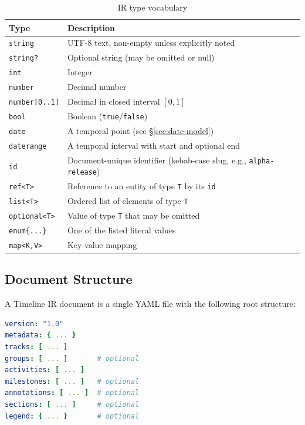 \begin{table}[h]
\centering
\begin{tabular}{lp{10cm}}
\toprule
\textbf{Type} & \textbf{Description} \\
\midrule
\texttt{string} & UTF-8 text, non-empty unless explicitly noted \\
\texttt{string?} & Optional string (may be omitted or null) \\
\texttt{int} & Integer \\
\texttt{number} & Decimal number \\
\texttt{number[0..1]} & Decimal in closed interval $[0, 1]$ \\
\texttt{bool} & Boolean (\texttt{true}/\texttt{false}) \\
\texttt{date} & A temporal point (see \S\ref{sec:date-model}) \\
\texttt{daterange} & A temporal interval with start and optional end \\
\texttt{id} & Document-unique identifier (kebab-case slug, e.g., \texttt{alpha-release}) \\
\texttt{ref<T>} & Reference to an entity of type \texttt{T} by its \texttt{id} \\
\texttt{list<T>} & Ordered list of elements of type \texttt{T} \\
\texttt{optional<T>} & Value of type \texttt{T} that may be omitted \\
\texttt{enum\{...\}} & One of the listed literal values \\
\texttt{map<K,V>} & Key-value mapping \\
\bottomrule
\end{tabular}
\caption{IR type vocabulary}
\label{tab:type-vocab}
\end{table}

\subsection{Document Structure}
\label{sec:ir-structure}

A Timeline IR document is a single YAML file with the following root structure:

\begin{lstlisting}[language=yaml,caption={Root document structure}]
version: "1.0"
metadata: { ... }
tracks: [ ... ]
groups: [ ... ]       # optional
activities: [ ... ]
milestones: [ ... ]   # optional
annotations: [ ... ]  # optional
sections: [ ... ]     # optional
legend: { ... }       # optional
\end{lstlisting}


